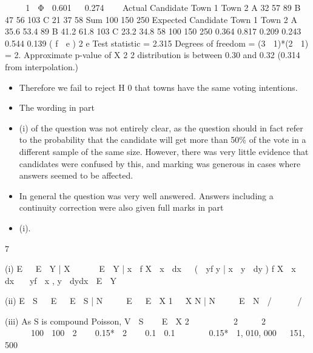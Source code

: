 \documentclass[a4paper,12pt]{article}
\begin{document}


  1  Φ  0.601   0.274



Actual Candidate
Town 1
Town 2 A
32
57
89 B
47
56
103 C
21
37
58 Sum
100
150
250
Expected Candidate
Town 1
Town 2 A
35.6
53.4
89 B
41.2
61.8
103 C
23.2
34.8
58 100
150
250
0.364 0.817 0.209 0.243 0.544 0.139
( f  e ) 2
e
Test statistic = 2.315
Degrees of freedom = (3  1)*(2  1) = 2. Approximate p-value of X 2 2
distribution is between 0.30 and 0.32 (0.314 from interpolation.)
\begin{itemize}
\item Therefore we fail to reject H 0 that towns have the same voting intentions.
\item The wording in part \item (i) of the question was not entirely clear, as the question should in fact refer to the probability that the candidate will get more than 50\% of the vote in a different sample of the same size. However, there was very little evidence that candidates were confused by this, and marking was generous in cases where answers seemed to be affected. 
\item In general the question was very well answered. Answers including a continuity correction
were also given full marks in part \item (i).
\end{itemize}
7
\item (i)
E   E  Y | X      E  Y | x  f X  x  dx   (  yf y | x  y  dy ) f X  x  dx
  yf  x , y  dydx  E  Y 
\item (ii)
E  S   E   E  S | N     E   E  X 1  X N | N     E  N  /     / 


(iii)
As S is compound Poisson,
V  S    E  X 2 
 
     2 
   2    
     


 100  100  2 

 0.15*  2  
 0.1  0.1   


 0.15*  1, 010, 000 
 151, 500
\end{document}
